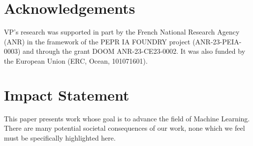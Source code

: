 \documentclass{article}
\begin{document}
\printAffiliationsAndNotice{} 




%

%




\newpage
\section*{Acknowledgements}
VP’s research was supported in part by the French National Research Agency (ANR) in the framework of the PEPR IA FOUNDRY project (ANR-23-PEIA-0003) and through the grant DOOM ANR-23-CE23-0002. It was also funded by the European Union (ERC, Ocean, 101071601).
\section*{Impact Statement}
This paper presents work whose goal is to advance the field of Machine
Learning. There are many potential societal consequences of our work, none
which we feel must be specifically highlighted here.


\newpage
\appendix
\onecolumn

\end{document}
